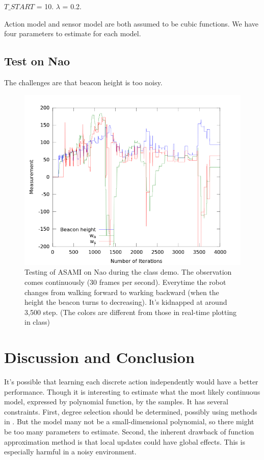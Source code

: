 \documentclass[10pt]{IEEEtran}
\begin{document}
$T\_START$ = 10. $\lambda$ = 0.2. 

Action model and sensor model are both assumed to be cubic functions.
We have four parameters to estimate for each model.

\subsection{Test on Nao}

The challenges are that beacon height is too noisy.

\begin{figure}
\centering
\includegraphics[width=\columnwidth]{demoResult.png}
\caption{Testing of ASAMI on Nao during the class demo. The
observation comes continuously (30 frames per second). Everytime the
robot changes from walking forward to warking backward (when the
height the beacon turns to decreasing). It's kidnapped at around 3,500
step.  (The colors are different from those in real-time plotting in
class)}

\label{fig:fuelworld}
\end{figure}


\section{Discussion and Conclusion}
\label{sec:dis}

It's possible that learning each discrete action independently would
have a better performance. Though it is interesting to estimate what
the most likely continuous model, expressed by polynomial function, by
the samples. It has several constraints. First, degree selection
should be determined, possibly using methods in
\cite{IJAIT08-stronger}. But the model many not be a small-dimensional
polynomial, so there might be too many parameters to estimate. Second,
the inherent drawback of function approximation method is that local
updates could have global effects. This is especially harmful in a
noisy environment.




\end{document}
